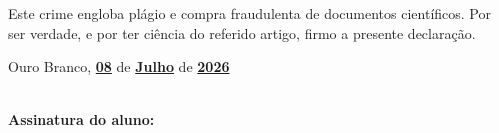 \documentclass[a4paper,12pt]{article}
\begin{document}
Este crime engloba plágio e compra fraudulenta de documentos científicos. Por ser verdade, e por ter ciência do referido artigo, firmo a presente declaração.

\vspace{0.8cm}

Ouro Branco, \underline{\textbf{08}} de \underline{\textbf{Julho}} de \underline{\textbf{2026}}  

\vspace{0.5cm}
\par \hfill \\
\textbf{Assinatura do aluno:} \hrulefill
\end{document}
